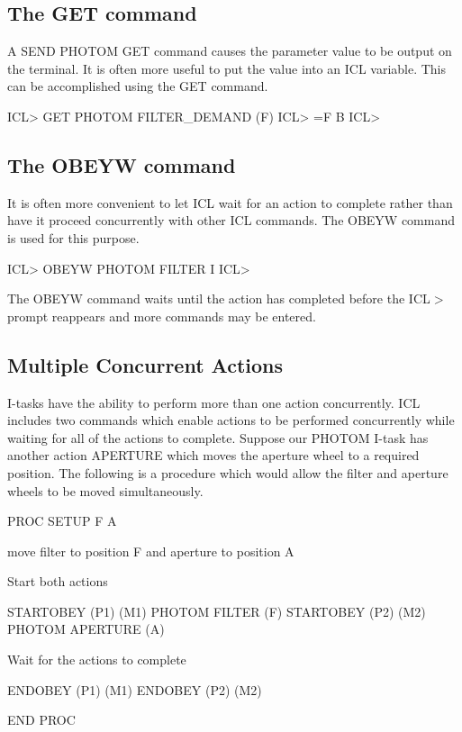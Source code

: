\documentclass[twoside,11pt,nolof,chapters]{starlink}
\begin{document}
\subsection{The GET command}

A SEND PHOTOM GET command causes the parameter value to be output on the
terminal. It is often more useful to put the value into an ICL variable.
This can be accomplished using the GET command.

\begin{terminalv}
    ICL> GET PHOTOM FILTER_DEMAND (F)
    ICL> =F
    B
    ICL>
\end{terminalv}

\subsection{The OBEYW command}

It is often more convenient to let ICL wait for an action to complete rather than
have it proceed concurrently with other ICL commands. The OBEYW command
is used for this purpose.

\begin{terminalv}
    ICL> OBEYW PHOTOM FILTER I
    ICL>
\end{terminalv}

The OBEYW command waits until the action has completed before the ICL$>$
prompt reappears and more commands may be entered.

\subsection{Multiple Concurrent Actions}

I-tasks have the ability to perform more than one action concurrently.
ICL includes two commands which enable actions to be performed concurrently
while waiting for all of the actions to complete. Suppose our PHOTOM
I-task has another action APERTURE which moves the aperture wheel to
a required position. The following is a procedure which would allow the
filter and aperture wheels to be moved simultaneously.

\begin{terminalv}
    PROC SETUP  F  A

{  move filter to position F and aperture to position A  }

{  Start both actions  }

      STARTOBEY (P1) (M1) PHOTOM FILTER (F)
      STARTOBEY (P2) (M2) PHOTOM APERTURE (A)

{  Wait for the actions to complete  }

      ENDOBEY (P1) (M1)
      ENDOBEY (P2) (M2)

    END PROC
\end{terminalv}
\end{document}
